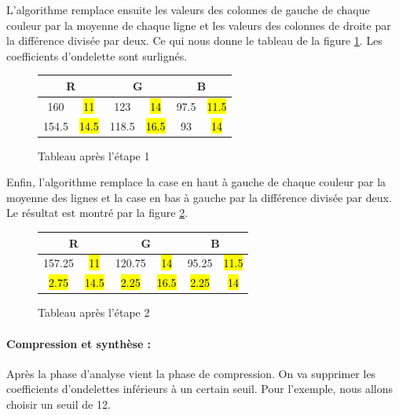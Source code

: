 \documentclass{article}
\begin{document}
L'algorithme remplace ensuite les valeurs des colonnes de gauche de chaque couleur par la moyenne  de chaque ligne et les valeurs des colonnes de droite par la différence divisée par deux. Ce qui nous donne le tableau de la figure \ref{tab2}. Les coefficients d'ondelette sont surlignés.

\begin{figure}[!h]
\begin{center}
\begin{tabular}{|c|c|c|c|c|c|}
\hline
\multicolumn{2}{|c|}{R} & \multicolumn{2}{|c|}{G}  & \multicolumn{2}{|c|}{B} \\
\hline
160    & \hl{11}   &   123  & \hl{14} &   97.5  & \hl{11.5}   \\ 
\hline
154.5    & \hl{14.5}   &   118.5  & \hl{16.5} &   93  & \hl{14} \\
\hline
\end{tabular}
\end{center}
\caption{Tableau après l'étape 1}
\label{tab2}
\end{figure}


Enfin, l'algorithme remplace la case en haut à gauche de chaque couleur par la moyenne des lignes et la case en bas à gauche par la différence divisée par deux. Le résultat est montré par la figure \ref{tab3}.

\begin{figure}[!h]
\begin{center}
\begin{tabular}{|c|c|c|c|c|c|}
\hline
\multicolumn{2}{|c|}{R} & \multicolumn{2}{|c|}{G}  & \multicolumn{2}{|c|}{B} \\
\hline
157.25    & \hl{11}   &   120.75  & \hl{14} &   95.25  & \hl{11.5}   \\ 
\hline
\hl{2.75}    & \hl{14.5}   &   \hl{2.25}  & \hl{16.5} &   \hl{2.25}  & \hl{14} \\
\hline
\end{tabular}
\end{center}
\caption{Tableau après l'étape 2}
\label{tab3}
\end{figure}



\paragraph{Compression et synthèse :}

Après la phase d'analyse vient la phase de compression. On va supprimer les coefficients d'ondelettes inférieurs à un certain seuil. Pour l'exemple, nous allons choisir un seuil de 12.
\end{document}
